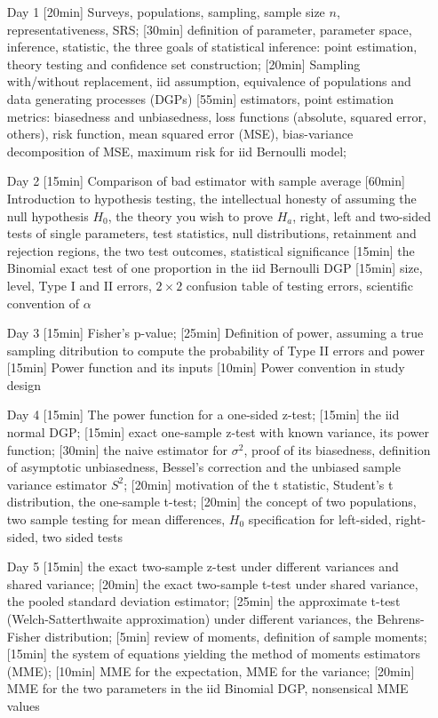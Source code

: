 \begin{enumerate}
\item[Day 1] [20min] Surveys, populations, sampling, sample size $n$, representativeness, SRS; [30min] definition of parameter, parameter space, inference, statistic, the three goals of statistical inference: point estimation, theory testing and confidence set construction; [20min] Sampling with/without replacement, iid assumption, equivalence of populations and data generating processes (DGPs) [55min] estimators, point estimation metrics: biasedness and unbiasedness, loss functions (absolute, squared error, others), risk function, mean squared error (MSE), bias-variance decomposition of MSE, maximum risk for iid Bernoulli model; 

\item[Day 2] [15min] Comparison of bad estimator with sample average [60min] Introduction to hypothesis testing, the intellectual honesty of assuming the null hypothesis $H_0$, the theory you wish to prove $H_a$, right, left and two-sided tests of single parameters, test statistics, null distributions, retainment and rejection regions, the two test outcomes, statistical significance [15min] the Binomial exact test of one proportion in the iid Bernoulli DGP [15min] size, level, Type I and II errors, $2 \times 2$ confusion table of testing errors, scientific convention of $\alpha$

\item[Day 3] [15min] Fisher's p-value; [25min] Definition of power, assuming a true sampling ditribution to compute the probability of Type II errors and power [15min] Power function and its inputs [10min] Power convention in study design


\item[Day 4] [15min] The power function for a one-sided z-test; [15min] the iid normal DGP; [15min] exact one-sample z-test with known variance, its power function; [30min] the naive estimator for $\sigma^2$, proof of its biasedness, definition of asymptotic unbiasedness, Bessel's correction and the unbiased sample variance estimator $S^2$; [20min] motivation of the t statistic, Student's t distribution, the one-sample t-test; [20min] the concept of two populations, two sample testing for mean differences, $H_0$ specification for left-sided, right-sided, two sided tests

\item[Day 5] [15min] the exact two-sample z-test under different variances and shared variance; [20min] the exact two-sample t-test under shared variance, the pooled standard deviation estimator; [25min] the approximate t-test (Welch-Satterthwaite approximation) under different variances, the Behrens-Fisher distribution; [5min] review of moments, definition of sample moments; [15min] the system of equations yielding the method of moments estimators (MME); [10min] MME for the expectation, MME for the variance; [20min] MME for the two parameters in the iid Binomial DGP, nonsensical MME values


\end{enumerate}
